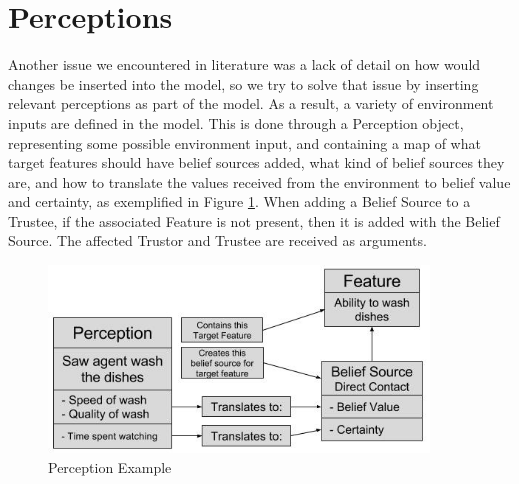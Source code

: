 \section{Perceptions}
Another issue we encountered in literature was a lack of detail on how would changes be inserted into the model, so we try to solve that issue by inserting relevant perceptions as part of the model. As a result, a variety of environment inputs are defined in the model. This is done through a Perception object, representing some possible environment input, and containing a map of what target features should have belief sources added, what kind of belief sources they are, and how to translate the values received from the environment to belief value and certainty, as exemplified in Figure \ref{fig:Perceptions Diagram}. When adding a Belief Source to a Trustee, if the associated Feature is not present, then it is added with the Belief Source. The affected Trustor and Trustee are received as arguments.

\begin{figure}[hbt]
    \centering
    \includegraphics[width=0.9\textwidth]{figures/PerceptionsDiagram.jpg}
    \caption{Perception Example}
    \label{fig:Perceptions Diagram}
\end{figure}



